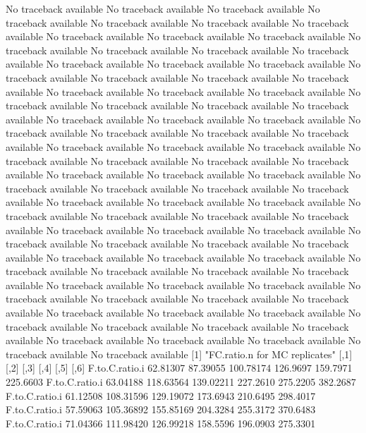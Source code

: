 \documentclass[11pt]{article} %
\begin{document}
\begin{Schunk}
\begin{Soutput}
No traceback available 
No traceback available 
No traceback available 
No traceback available 
No traceback available 
No traceback available 
No traceback available 
No traceback available 
No traceback available 
No traceback available 
No traceback available 
No traceback available 
No traceback available 
No traceback available 
No traceback available 
No traceback available 
No traceback available 
No traceback available 
No traceback available 
No traceback available 
No traceback available 
No traceback available 
No traceback available 
No traceback available 
No traceback available 
No traceback available 
No traceback available 
No traceback available 
No traceback available 
No traceback available 
No traceback available 
No traceback available 
No traceback available 
No traceback available 
No traceback available 
No traceback available 
No traceback available 
No traceback available 
No traceback available 
No traceback available 
No traceback available 
No traceback available 
No traceback available 
No traceback available 
No traceback available 
No traceback available 
No traceback available 
No traceback available 
No traceback available 
No traceback available 
No traceback available 
No traceback available 
No traceback available 
No traceback available 
No traceback available 
No traceback available 
No traceback available 
No traceback available 
No traceback available 
No traceback available 
No traceback available 
No traceback available 
No traceback available 
No traceback available 
No traceback available 
No traceback available 
No traceback available 
No traceback available 
No traceback available 
No traceback available 
No traceback available 
No traceback available 
No traceback available 
No traceback available 
No traceback available 
No traceback available 
No traceback available 
No traceback available 
No traceback available 
No traceback available 
No traceback available 
No traceback available 
No traceback available 
No traceback available 
No traceback available 
No traceback available 
No traceback available 
No traceback available 
No traceback available 
[1] "FC.ratio.n for MC replicates"
                    [,1]      [,2]      [,3]     [,4]     [,5]     [,6]
F.to.C.ratio.i  62.81307  87.39055 100.78174 126.9697 159.7971 225.6603
F.to.C.ratio.i  63.04188 118.63564 139.02211 227.2610 275.2205 382.2687
F.to.C.ratio.i  61.12508 108.31596 129.19072 173.6943 210.6495 298.4017
F.to.C.ratio.i  57.59063 105.36892 155.85169 204.3284 255.3172 370.6483
F.to.C.ratio.i  71.04366 111.98420 126.99218 158.5596 196.0903 275.3301

\end{Soutput}
\end{Schunk}
\end{document}
